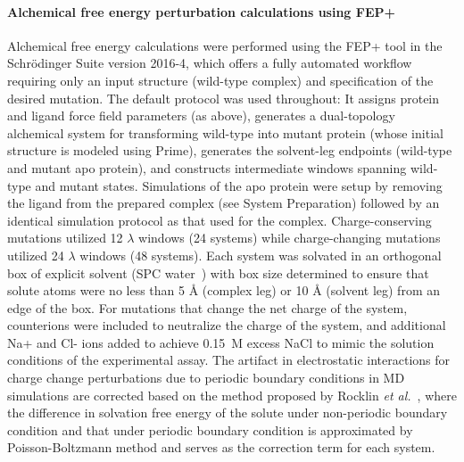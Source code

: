 \documentclass[phd,tocprelim]{cornell}
\begin{document}
\paragraph{Alchemical free energy perturbation calculations using FEP+}
Alchemical free energy calculations were performed using the FEP+ tool in the Schr\"{o}dinger Suite version 2016-4, which offers a fully automated workflow requiring only an input structure (wild-type complex) and specification of the desired mutation. 
The default protocol was used throughout: It assigns protein and ligand force field parameters (as above), generates a dual-topology~\citep{Pearlman:J.Phys.Chem.:1994} alchemical system for transforming wild-type into mutant protein (whose initial structure is modeled using Prime), generates the solvent-leg endpoints (wild-type and mutant apo protein), and constructs intermediate  windows spanning wild-type and mutant states. 
Simulations of the apo protein were setup by removing the ligand from the prepared complex (see System Preparation) followed by an identical simulation protocol as that used for the complex.
Charge-conserving mutations utilized 12 $\lambda$ windows (24 systems) while charge-changing mutations utilized 24 $\lambda$  windows (48 systems). 
Each system was solvated in an orthogonal box of explicit solvent (SPC water~\citep{Berendsen:IntermolecularForces:1981}) with box size determined to ensure that solute atoms were no less than 5 {\AA} (complex leg) or 10 {\AA} (solvent leg) from an edge of the box. 
For mutations that change the net charge of the system, counterions were included to neutralize the charge of the system, and additional Na+ and Cl- ions added to achieve 0.15~M excess NaCl to mimic the solution conditions of the experimental assay. 
The artifact in electrostatic interactions for charge change perturbations due to periodic boundary conditions in MD simulations are corrected based on the method proposed by Rocklin \textit{et al.}~\citep{Rocklin:J.Chem.Phys.:2013e},
where the difference in solvation free energy of the solute under non-periodic boundary condition and that under periodic boundary condition is approximated by Poisson-Boltzmann method and serves as the correction term for each system.
\end{document}
